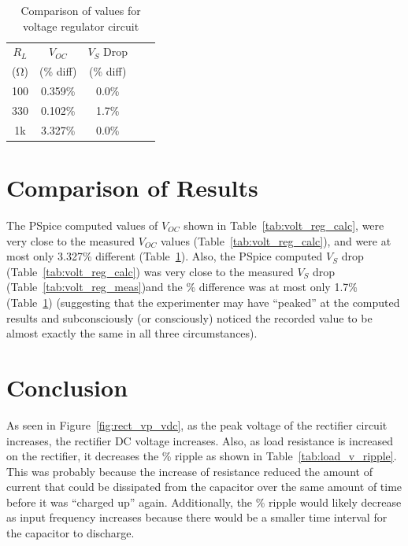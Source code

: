 \documentclass{article}
\begin{document}
\begin{table}
  \centering
  \begin{tabular}{ccccc}
    $R_L$       & $V_{OC}$  & $V_S$ Drop \\
    (\si{\ohm}) & (\% diff) & (\% diff)  \\
    \hline
    100         & 0.359\%   & 0.0\%      \\
    330         & 0.102\%   & 1.7\%      \\
    1k          & 3.327\%   & 0.0\%      \\
  \end{tabular}
  \caption{\label{tab:volt_reg_diff} Comparison of values for voltage regulator circuit}
\end{table}

\section{Comparison of Results}
\label{sec:comp_of_res}

The PSpice computed values of $V_{OC}$ shown in Table~\ref{tab:volt_reg_calc}, were very close to the measured $V_{OC}$ values (Table~\ref{tab:volt_reg_calc}), and were at most only 3.327\% different (Table~\ref{tab:volt_reg_diff}).  Also, the PSpice computed $V_S$ drop (Table~\ref{tab:volt_reg_calc}) was very close to the measured $V_S$ drop (Table~\ref{tab:volt_reg_meas})and the \% difference was at most only 1.7\% (Table~\ref{tab:volt_reg_diff}) (suggesting that the experimenter may have “peaked” at the computed results and subconsciously (or consciously) noticed the recorded value to be almost exactly the same in all three circumstances).

\section{Conclusion}
\label{sec:conclusion}
As seen in Figure~\ref{fig:rect_vp_vdc}, as the peak voltage of the rectifier circuit increases, the rectifier DC voltage increases.  Also, as load resistance is increased on the rectifier, it decreases the \% ripple as shown in Table~\ref{tab:load_v_ripple}.  This was probably because the increase of resistance reduced the amount of current that could be dissipated from the capacitor over the same amount of time before it was “charged up” again.  Additionally, the \% ripple would likely decrease as input frequency increases because there would be a smaller time interval for the capacitor to discharge.
\end{document}
